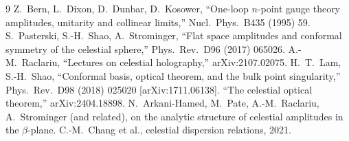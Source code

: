 \documentclass[12pt,a4paper]{article}
\theoremstyle{plain}
\theoremstyle{definition}
\theoremstyle{remark}
\begin{document}
\begin{thebibliography}{9}
 Z.~Bern, L.~Dixon, D.~Dunbar, D.~Kosower,
``One-loop $n$-point gauge theory amplitudes, unitarity and collinear
limits,'' Nucl.\ Phys.\ B435 (1995) 59.
 S.~Pasterski, S.-H.~Shao, A.~Strominger,
``Flat space amplitudes and conformal symmetry of the celestial
sphere,'' Phys.\ Rev.\ D96 (2017) 065026.
 A.-M.~Raclariu, ``Lectures on celestial
holography,'' arXiv:2107.02075.
 H.~T.~Lam, S.-H.~Shao, ``Conformal basis,
optical theorem, and the bulk point singularity,'' Phys.\ Rev.\ D98
(2018) 025020 [arXiv:1711.06138].
 ``The celestial optical theorem,''
arXiv:2404.18898.
 N.~Arkani-Hamed, M.~Pate, A.-M.~Raclariu,
A.~Strominger (and related), on the analytic structure of celestial
amplitudes in the $\beta$-plane.
 C.-M.~Chang et al., celestial dispersion
relations, 2021.
\end{thebibliography}
\end{document}
